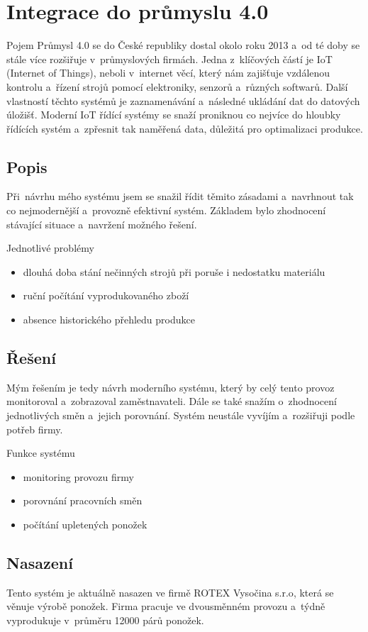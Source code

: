\chapter{Integrace do průmyslu 4.0}
Pojem Průmysl 4.0 se do České republiky dostal okolo roku 2013 a~od té doby se stále více rozšiřuje v~průmyslových firmách.
Jedna z~klíčových částí je IoT (Internet of Things), neboli v~internet věcí, který nám zajišťuje vzdálenou kontrolu a~řízení strojů pomocí elektroniky, senzorů a~různých softwarů.
Další vlastností těchto systémů je zaznamenávání a~následné ukládání dat do datových úložišť.
Moderní IoT řídící systémy se snaží proniknou co nejvíce do hloubky řídících systém a~zpřesnit tak naměřená data, důležitá pro optimalizaci produkce.   

\section{Popis}
Při~návrhu mého systému jsem se snažil řídit těmito zásadami a~navrhnout tak co nejmodernější a~provozně efektivní systém.
Základem bylo zhodnocení stávající situace a~navržení možného řešení.

Jednotlivé problémy
\begin{itemize}
    \item dlouhá doba stání nečinných strojů při poruše i nedostatku materiálu
    \item ruční počítání vyprodukovaného zboží
    \item absence historického přehledu produkce
\end{itemize}

\section{Řešení}
Mým řešením je tedy návrh moderního systému, který by celý tento provoz monitoroval a~zobrazoval zaměstnavateli.
Dále se také snažím o~zhodnocení jednotlivých směn a~jejich porovnání.
Systém neustále vyvíjím a~rozšiřuji podle potřeb firmy.

Funkce systému
\begin{itemize}
    \item monitoring provozu firmy
    \item porovnání pracovních směn
    \item počítání upletených ponožek
\end{itemize}



\section{Nasazení}
Tento systém je aktuálně nasazen ve firmě ROTEX Vysočina s.r.o\cite{ROTEX}, která se věnuje výrobě ponožek. 
Firma pracuje ve dvousměnném provozu a~týdně vyprodukuje v~průměru 12000 párů ponožek. 

